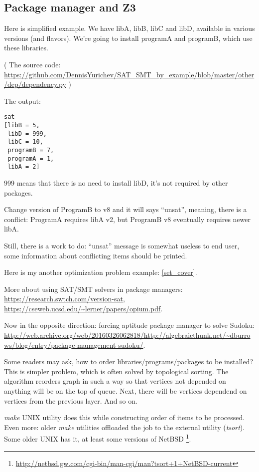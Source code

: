 \subsection{Package manager and Z3}

Here is simplified example.
We have libA, libB, libC and libD, available in various versions (and flavors).
We're going to install programA and programB, which use these libraries.



( The source code: \url{https://github.com/DennisYurichev/SAT_SMT_by_example/blob/master/other/dep/dependency.py} )

The output:

\begin{lstlisting}
sat
[libB = 5,
 libD = 999,
 libC = 10,
 programB = 7,
 programA = 1,
 libA = 2]
\end{lstlisting}

999 means that there is no need to install libD, it's not required by other packages.

Change version of ProgramB to v8 and it will says ``unsat'', meaning, there is a conflict:
ProgramA requires libA v2, but ProgramB v8 eventually requires newer libA.

Still, there is a work to do: ``unsat'' message is somewhat useless to end user,
some information about conflicting items should be printed.

Here is my another optimization problem example: \ref{set_cover}.

More about using SAT/SMT solvers in package managers: \url{https://research.swtch.com/version-sat},
\url{https://cseweb.ucsd.edu/~lerner/papers/opium.pdf}.

Now in the opposite direction: forcing aptitude package manager to solve Sudoku: \\
\url{http://web.archive.org/web/20160326062818/http://algebraicthunk.net/~dburrows/blog/entry/package-management-sudoku/}.

Some readers may ask, how to order libraries/programs/packages to be installed?
This is simpler problem, which is often solved by topological sorting.
The algorithm reorders graph in such a way so that vertices not depended on anything will be on the top of queue.
Next, there will be vertices dependend on vertices from the previous layer.
And so on.

\textit{make} UNIX utility does this while constructing order of items to be processed.
Even more: older \textit{make} utilities offloaded the job to the external utility (\textit{tsort}).
Some older UNIX has it, at least some versions of NetBSD
\footnote{\url{http://netbsd.gw.com/cgi-bin/man-cgi/man?tsort+1+NetBSD-current}}.

